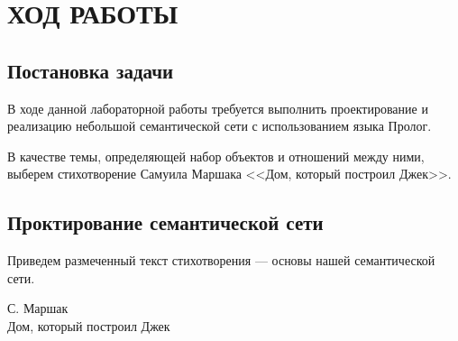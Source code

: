 \section{ХОД РАБОТЫ}

\subsection{Постановка задачи}

В ходе данной лабораторной работы требуется выполнить проектирование
и реализацию небольшой семантической сети с использованием языка Пролог.

В качестве темы, определяющей набор объектов и отношений между ними,
выберем стихотворение Самуила Маршака <<Дом, который построил Джек>>.

\subsection{Проктирование семантической сети}

Приведем размеченный текст стихотворения ---
основы нашей семантической сети.

\begin{center}
С. Маршак \\
Дом, который построил Джек
\end{center}

